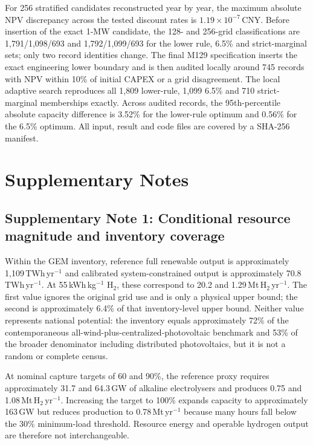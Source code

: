 \documentclass[pdflatex,sn-nature]{sn-jnl}
\begin{document}
For 256 stratified candidates reconstructed year by year, the maximum absolute NPV discrepancy across the tested discount rates is $1.19\times10^{-7}$\,CNY. Before insertion of the exact 1-MW candidate, the 128- and 256-grid classifications are 1,791/1,098/693 and 1,792/1,099/693 for the lower rule, 6.5\% and strict-marginal sets; only two record identities change. The final M129 specification inserts the exact engineering lower boundary and is then audited locally around 745 records with NPV within 10\% of initial CAPEX or a grid disagreement. The local adaptive search reproduces all 1,809 lower-rule, 1,099 6.5\% and 710 strict-marginal memberships exactly. Across audited records, the 95th-percentile absolute capacity difference is 3.52\% for the lower-rule optimum and 0.56\% for the 6.5\% optimum. All input, result and code files are covered by a SHA-256 manifest.

\FloatBarrier
\section*{Supplementary Notes}

\subsection*{Supplementary Note 1: Conditional resource magnitude and inventory coverage}

Within the GEM inventory, reference full renewable output is approximately 1,109\,TWh\,yr$^{-1}$ and calibrated system-constrained output is approximately 70.8\,TWh\,yr$^{-1}$. At 55\,kWh\,kg$^{-1}$ H$_2$, these correspond to 20.2 and 1.29\,Mt\,H$_2$\,yr$^{-1}$. The first value ignores the original grid use and is only a physical upper bound; the second is approximately 6.4\% of that inventory-level upper bound. Neither value represents national potential: the inventory equals approximately 72\% of the contemporaneous all-wind-plus-centralized-photovoltaic benchmark and 53\% of the broader denominator including distributed photovoltaics, but it is not a random or complete census.

At nominal capture targets of 60 and 90\%, the reference proxy requires approximately 31.7 and 64.3\,GW of alkaline electrolysers and produces 0.75 and 1.08\,Mt\,H$_2$\,yr$^{-1}$. Increasing the target to 100\% expands capacity to approximately 163\,GW but reduces production to 0.78\,Mt\,yr$^{-1}$ because many hours fall below the 30\% minimum-load threshold. Resource energy and operable hydrogen output are therefore not interchangeable.
\end{document}
